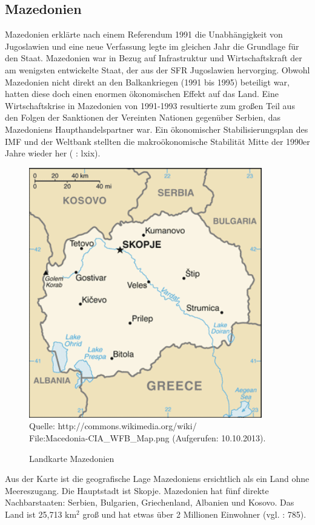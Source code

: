 \subsection{Mazedonien} 
Mazedonien erklärte nach einem Referendum 1991 die Unabhängigkeit von Jugoslawien und eine neue Verfassung legte im gleichen Jahr die Grundlage für den Staat. Mazedonien war in Bezug auf Infrastruktur und Wirtschaftskraft der am wenigsten entwickelte Staat, der aus der SFR Jugoslawien hervorging. Obwohl Mazedonien nicht direkt an den Balkankriegen (1991 bis 1995) beteiligt war, hatten diese doch einen enormen ökonomischen Effekt auf das Land. Eine Wirtschaftskrise in Mazedonien von 1991-1993 resultierte zum großen Teil aus den Folgen der Sanktionen der Vereinten Nationen gegenüber Serbien, das Mazedoniens Haupthandelspartner war. Ein ökonomischer Stabilisierungsplan des IMF und der Weltbank stellten die makroökonomische Stabilität Mitte der 1990er Jahre wieder her (\cite{bech09} : lxix). 
\begin{figure}[H]
\setlength\belowcaptionskip{10pt}
 \caption{Landkarte Mazedonien}
  \centering
  \includegraphics[width=4in]{Material/Macedonia-CIA_WFB_Map}\\
 Quelle: http://commons.wikimedia.org/wiki/\\
File:Macedonia-CIA\_WFB\_Map.png (Aufgerufen: 10.10.2013).
\end{figure}

Aus der Karte ist die geografische Lage Mazedoniens ersichtlich als ein Land ohne Meereszugang. Die Hauptstadt ist Skopje. Mazedonien hat fünf direkte Nachbarstaaten: Serbien, Bulgarien, Griechenland, Albanien und Kosovo. Das Land ist 25,713 km$^2$ groß und hat etwas über 2 Millionen Einwohner (vgl. \cite{ramet} : 785). 

